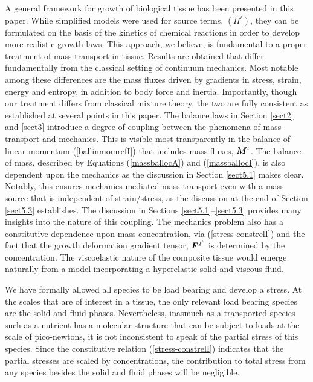 A general framework for growth of biological tissue has been
presented in this paper. While simplified models were used for
source terms, $(\Pi^\iota)$, they can be formulated on the basis
of the kinetics of chemical reactions in order to develop more
realistic growth laws. This approach, we believe, is fundamental
to a proper treatment of mass transport in tissue. Results are
obtained that differ fundamentally from the classical setting of
continuum mechanics. Most notable among these differences are the
mass fluxes driven by gradients in stress, strain, energy and
entropy, in addition to body force and inertia. Importantly,
though our treatment differs from classical mixture theory, the
two are fully consistent as established at several points in this
paper. The balance laws in Section \ref{sect2} and \ref{sect3}
introduce a degree of coupling between the phenomena of mass
transport and mechanics. This is visible most transparently in the
balance of linear momentum (\ref{ballinmomrefI}) that includes
mass fluxes, $\mbox{\boldmath$ M$}^\iota$. The balance of mass, described by
Equations (\ref{massballocA}) and (\ref{massballocI}), is also
dependent upon the mechanics as the discussion in Section
\ref{sect5.1} makes clear. Notably, this ensures
mechanics-mediated mass transport even with a mass source that is
independent of strain/stress, as the discussion at the end of
Section \ref{sect5.3} establishes. The discussion in Sections
\ref{sect5.1}--\ref{sect5.3} provides many insights into the
nature of this coupling. The mechanics problem also has a
constitutive dependence upon mass concentration, via
(\ref{stress-constrelI}) and the fact that the growth deformation
gradient tensor, $\mbox{\boldmath$ F$}^{\mathrm{g}^\iota}$ is determined by the
concentration. The viscoelastic nature of the composite tissue
would emerge naturally from a model incorporating a hyperelastic
solid and viscous fluid.

We have formally allowed all species to be load bearing and
develop a stress. At the scales that are of interest in a tissue,
the only relevant load bearing species are the solid and fluid
phases. Nevertheless, inasmuch as a transported species such as a
nutrient has a molecular structure that can be subject to loads at
the scale of pico-newtons, it is not inconsistent to speak of the
partial stress of this species. Since the constitutive relation
(\ref{stress-constrelI}) indicates that the partial stresses are
scaled by concentrations, the contribution to total stress from
any species besides the solid and fluid phases will be negligible.

